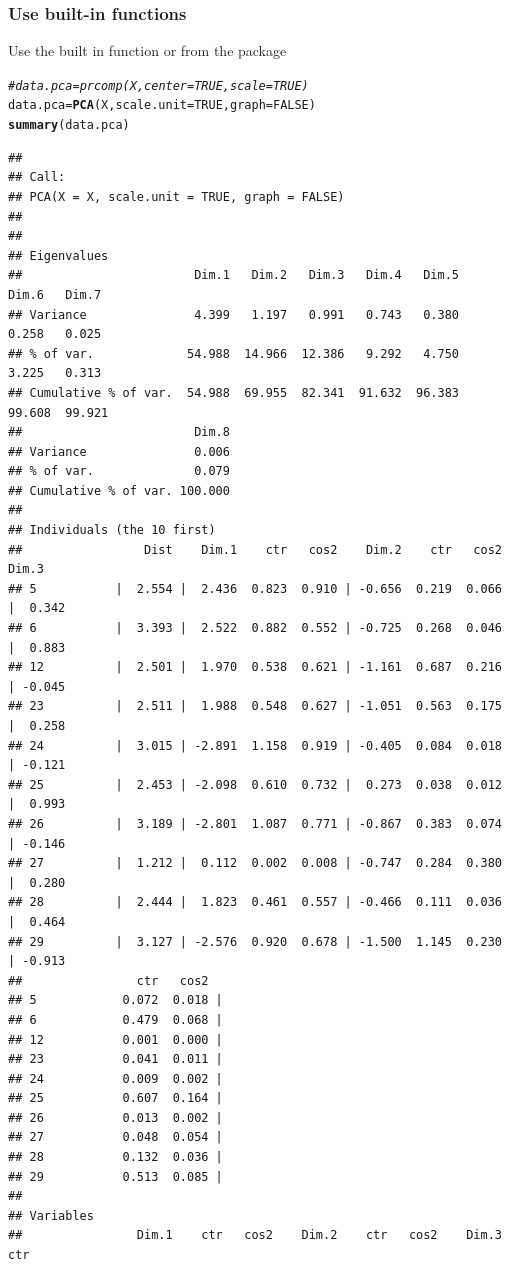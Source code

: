 \documentclass[aspectratio=169]{beamer}\usepackage[]{graphicx}\usepackage[]{xcolor}
\makeatletter
\newcommand{\hlnum}[1]{\textcolor[rgb]{0.686,0.059,0.569}{#1}}%
\newcommand{\hlcom}[1]{\textcolor[rgb]{0.678,0.584,0.686}{\textit{#1}}}%
\newcommand{\hlstd}[1]{\textcolor[rgb]{0.345,0.345,0.345}{#1}}%
\newcommand{\hlkwb}[1]{\textcolor[rgb]{0.69,0.353,0.396}{#1}}%
\newcommand{\hlkwc}[1]{\textcolor[rgb]{0.333,0.667,0.333}{#1}}%
\newcommand{\hlkwd}[1]{\textcolor[rgb]{0.737,0.353,0.396}{\textbf{#1}}}%
\newenvironment{kframe}{%
 \def\at@end@of@kframe{}%
 \ifinner\ifhmode%
  \def\at@end@of@kframe{\end{minipage}}%
  \begin{minipage}{\columnwidth}%
 \fi\fi%
 \def\FrameCommand##1{\hskip\@totalleftmargin \hskip-\fboxsep
 \colorbox{shadecolor}{##1}\hskip-\fboxsep
     \hskip-\linewidth \hskip-\@totalleftmargin \hskip\columnwidth}%
 \MakeFramed {\advance\hsize-\width
   \@totalleftmargin\z@ \linewidth\hsize
   \@setminipage}}%
 {\par\unskip\endMakeFramed%
 \at@end@of@kframe}
\newenvironment{knitrout}{}{} %
\makeatother
\begin{document}
\begin{frame}[fragile]\frametitle{Use built-in functions}
Use the built in function  or  from the  package
\vfill
\begin{knitrout}
\color{fgcolor}\begin{kframe}
\begin{alltt}
\hlcom{# data.pca = prcomp(X, center = TRUE, scale = TRUE)}
\hlstd{data.pca} \hlkwb{=} \hlkwd{PCA}\hlstd{(X,} \hlkwc{scale.unit} \hlstd{=} \hlnum{TRUE}\hlstd{,} \hlkwc{graph} \hlstd{=} \hlnum{FALSE}\hlstd{)}
\hlkwd{summary}\hlstd{(data.pca)}
\end{alltt}
\begin{verbatim}
## 
## Call:
## PCA(X = X, scale.unit = TRUE, graph = FALSE) 
## 
## 
## Eigenvalues
##                        Dim.1   Dim.2   Dim.3   Dim.4   Dim.5   Dim.6   Dim.7
## Variance               4.399   1.197   0.991   0.743   0.380   0.258   0.025
## % of var.             54.988  14.966  12.386   9.292   4.750   3.225   0.313
## Cumulative % of var.  54.988  69.955  82.341  91.632  96.383  99.608  99.921
##                        Dim.8
## Variance               0.006
## % of var.              0.079
## Cumulative % of var. 100.000
## 
## Individuals (the 10 first)
##                 Dist    Dim.1    ctr   cos2    Dim.2    ctr   cos2    Dim.3
## 5           |  2.554 |  2.436  0.823  0.910 | -0.656  0.219  0.066 |  0.342
## 6           |  3.393 |  2.522  0.882  0.552 | -0.725  0.268  0.046 |  0.883
## 12          |  2.501 |  1.970  0.538  0.621 | -1.161  0.687  0.216 | -0.045
## 23          |  2.511 |  1.988  0.548  0.627 | -1.051  0.563  0.175 |  0.258
## 24          |  3.015 | -2.891  1.158  0.919 | -0.405  0.084  0.018 | -0.121
## 25          |  2.453 | -2.098  0.610  0.732 |  0.273  0.038  0.012 |  0.993
## 26          |  3.189 | -2.801  1.087  0.771 | -0.867  0.383  0.074 | -0.146
## 27          |  1.212 |  0.112  0.002  0.008 | -0.747  0.284  0.380 |  0.280
## 28          |  2.444 |  1.823  0.461  0.557 | -0.466  0.111  0.036 |  0.464
## 29          |  3.127 | -2.576  0.920  0.678 | -1.500  1.145  0.230 | -0.913
##                ctr   cos2  
## 5            0.072  0.018 |
## 6            0.479  0.068 |
## 12           0.001  0.000 |
## 23           0.041  0.011 |
## 24           0.009  0.002 |
## 25           0.607  0.164 |
## 26           0.013  0.002 |
## 27           0.048  0.054 |
## 28           0.132  0.036 |
## 29           0.513  0.085 |
## 
## Variables
##                Dim.1    ctr   cos2    Dim.2    ctr   cos2    Dim.3    ctr

\end{verbatim}
\end{kframe}
\end{knitrout}
\end{frame}
\end{document}
